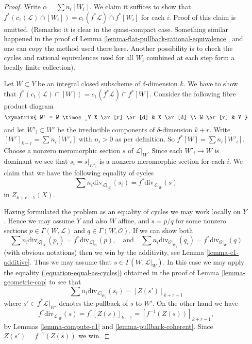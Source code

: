 \begin{proof}
Write $\alpha = \sum n_i[W_i]$. We claim it suffices to show that
$f^*(c_1(\mathcal{L}) \cap [W_i]) = c_1(f^*\mathcal{L}) \cap f^*[W_i]$
for each $i$. Proof of this claim is omitted.
(Remarks: it is clear in the quasi-compact case.
Something similar happened in the proof of
Lemma \ref{lemma-flat-pullback-rational-equivalence}, and one
can copy the method used there here. Another possibility
is to check the cycles and rational equivalences used
for all $W_i$ combined at each step form a locally finite collection).

\medskip\noindent
Let $W \subset Y$ be an integral closed subscheme of $\delta$-dimension $k$.
We have to show that
$f^*(c_1(\mathcal{L}) \cap [W]) = c_1(f^*\mathcal{L}) \cap f^*[W]$.
Consider the following fibre product diagram
$$
\xymatrix{
W' = W \times_Y X \ar[r] \ar[d] & X \ar[d] \\
W \ar[r] & Y
}
$$
and let $W'_i \subset W'$ be the irreducible components of
$\delta$-dimension $k + r$. Write
$[W']_{k + r} = \sum n_i[W'_i]$ with $n_i > 0$ as per definition.
So $f^*[W] = \sum n_i[W'_i]$. Choose a nonzero meromorphic section
$s$ of $\mathcal{L}|_W$. Since each $W'_i \to W$ is dominant we
see that $s_i = s|_{W'_i}$ is a nonzero meromorphic section for
each $i$. We claim that we have the following equality of
cycles
$$
\sum n_i\text{div}_{\mathcal{L}|_{W_i}}(s_i)
=
f^*\text{div}_{\mathcal{L}|_W}(s)
$$
in $Z_{k + r - 1}(X)$.

\medskip\noindent
Having formulated the problem as an equality of cycles
we may work locally on $Y$. Hence we may assume
$Y$ and also $W$ affine, and $s = p/q$ for some
nonzero sections $p \in \Gamma(W, \mathcal{L})$
and $q \in \Gamma(W, \mathcal{O})$. If we can show both
$$
\sum n_i\text{div}_{\mathcal{L}|_{W_i}}(p_i)
=
f^*\text{div}_{\mathcal{L}|_W}(p),
\quad\text{and}\quad
\sum n_i\text{div}_{\mathcal{O}|_{W_i}}(q_i)
=
f^*\text{div}_{\mathcal{O}|_W}(q)
$$
(with obvious notations) then we win by the
additivity, see Lemma \ref{lemma-c1-additive}.
Thus we may assume that $s \in \Gamma(W, \mathcal{L}|_W)$.
In this case we may apply the equality
(\ref{equation-equal-as-cycles}) obtained in the proof of
Lemma \ref{lemma-geometric-cap} to see that
$$
\sum n_i\text{div}_{\mathcal{L}|_{W_i}}(s_i)
=
[Z(s')]_{k + r - 1}
$$
where $s' \in f^*\mathcal{L}|_{W'}$ denotes the pullback
of $s$ to $W'$. On the other hand we have
$$
f^*\text{div}_{\mathcal{L}|_W}(s) = f^*[Z(s)]_{k - 1}
= [f^{-1}(Z(s))]_{k + r - 1},
$$
by Lemmas \ref{lemma-compute-c1} and \ref{lemma-pullback-coherent}.
Since $Z(s') = f^{-1}(Z(s))$ we win.
\end{proof}

